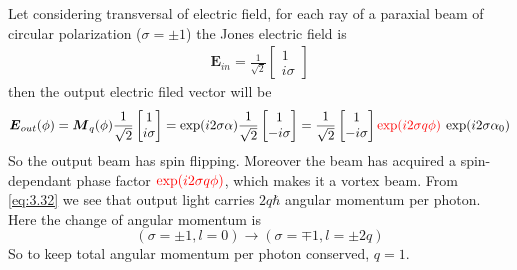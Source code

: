 \documentclass[11pt,a4paper]{article}
\numberwithin{equation}{section}
\begin{document}
Let considering transversal of electric field, for each ray of a paraxial beam of circular polarization ($\sigma=\pm1$) the Jones electric field is 
\begin{align}
	\boldsymbol{E}_{in} = \frac{1}{\sqrt{2}}
	\begin{bmatrix}
		1\\i\sigma
	\end{bmatrix}
\end{align}
then the output electric filed vector will be
\begin{align}
	\boldsymbol{E}_{out}(\phi) = \boldsymbol{M}_q(\phi)
	\frac{1}{\sqrt{2}}
	\begin{bmatrix}
		1\\i\sigma
	\end{bmatrix}
	= \exp(i2\sigma\alpha)\frac{1}{\sqrt{2}}
	\begin{bmatrix}
		1\\-i\sigma
	\end{bmatrix}
	=\frac{1}{\sqrt{2}}
	\begin{bmatrix}
		1\\-i\sigma
	\end{bmatrix}
	{\color{red}\exp(i2\sigma q\phi)}\: \exp(i2\sigma\alpha_0)
\end{align}
So the output beam has spin flipping. Moreover the beam has acquired a spin-dependant phase factor  ${\color{red}\exp(i2\sigma q\phi)}$, which makes it a vortex beam. From \ref{eq:3.32} we see that output light carries $2q\hbar$ angular momentum per photon. Here the change of angular momentum is 
$$(\sigma=\pm1,l=0)\longrightarrow (\sigma=\mp1,l=\pm2q)$$
So to keep total angular momentum per photon conserved, $q=1$.
\end{document}
